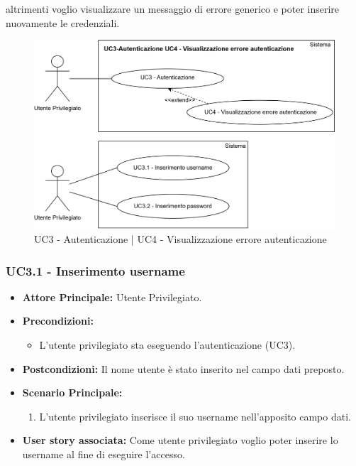 \documentclass[11pt]{article}
\begin{document}
\begin{justify}
\begin{itemize}
     altrimenti voglio visualizzare un messaggio di errore generico e poter inserire nuovamente le credenziali.
\end{itemize}
\begin{figure}[H]
    \centering
    \includegraphics[width=0.5\linewidth]{UC3-UC4image.png}
    \caption{UC3 - Autenticazione | UC4 - Visualizzazione errore autenticazione}
    \label{fig:UC3 e UC4}
\end{figure}
\subsubsection{\textbf{UC3.1 - Inserimento username}}
\begin{itemize}
     \item \textbf{Attore Principale:} Utente Privilegiato.
     \item \textbf{Precondizioni:} 
            \begin{itemize}
                \item L'utente privilegiato sta eseguendo l'autenticazione (UC3).
            \end{itemize}
     \item \textbf{Postcondizioni:} Il nome utente è stato inserito nel campo dati preposto.
     \item \textbf{Scenario Principale:}
        \begin{enumerate}
            \item L'utente privilegiato inserisce il suo username nell'apposito campo dati.
        \end{enumerate}
     \item \textbf{User story associata:} Come utente privilegiato voglio poter inserire lo username al fine di eseguire l'accesso.
\end{itemize}

\end{justify}
\end{document}

